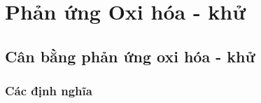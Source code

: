 
\chapter{Phản ứng Oxi hóa - khử}
\section{Cân bằng phản ứng oxi hóa - khử}
\subsection{Các định nghĩa}